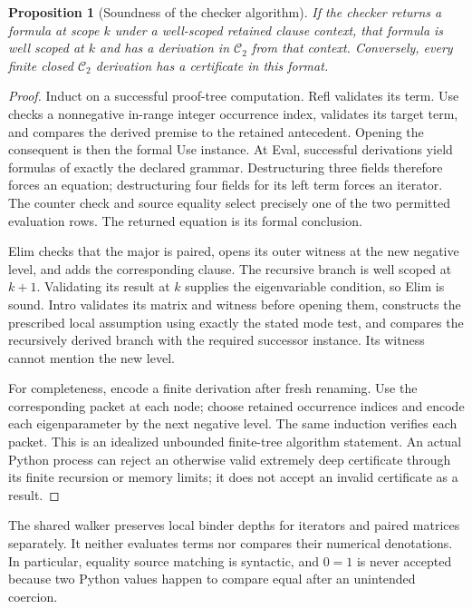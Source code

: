 \documentclass[11pt]{article}
\newtheorem{proposition}[theorem]{Proposition}
\theoremstyle{definition}\newtheorem{definition}[theorem]{Definition}
\newcommand{\Ctwo}{\mathcal C_2}
\begin{document}
\begin{proposition}[Soundness of the checker algorithm]
If the checker returns a formula at scope $k$ under a well-scoped
retained clause context, that formula is well scoped at $k$ and has
a derivation in $\Ctwo$ from that context. Conversely, every finite
closed $\Ctwo$ derivation has a certificate in this format.
\end{proposition}
\begin{proof}
Induct on a successful proof-tree computation. Refl validates its
term. Use checks a nonnegative in-range integer occurrence index,
validates its target term, and compares the derived premise to the
retained antecedent. Opening the consequent is then the formal Use
instance. At Eval, successful derivations yield formulas of exactly
the declared grammar. Destructuring three fields therefore forces
an equation; destructuring four fields for its left term forces an
iterator. The counter check and source equality select precisely
one of the two permitted evaluation rows. The returned equation is
its formal conclusion.

Elim checks that the major is paired, opens its outer witness at
the new negative level, and adds the corresponding clause. The
recursive branch is well scoped at $k+1$. Validating its result at
$k$ supplies the eigenvariable condition, so Elim is sound.
Intro validates its matrix and witness before opening them, constructs
the prescribed local assumption using exactly the stated mode test,
and compares the recursively derived branch with the required
successor instance. Its witness cannot mention the new level.

For completeness, encode a finite derivation after fresh renaming.
Use the corresponding packet at each node; choose retained occurrence
indices and encode each eigenparameter by the next negative level.
The same induction verifies each packet. This is an idealized
unbounded finite-tree algorithm statement. An actual Python process
can reject an otherwise valid extremely deep certificate through its
finite recursion or memory limits; it does not accept an invalid
certificate as a result.
\end{proof}

The shared walker preserves local binder depths for iterators and
paired matrices separately. It neither evaluates terms nor compares
their numerical denotations. In particular, equality source matching
is syntactic, and $0=1$ is never accepted because two Python values
happen to compare equal after an unintended coercion.
\end{document}

